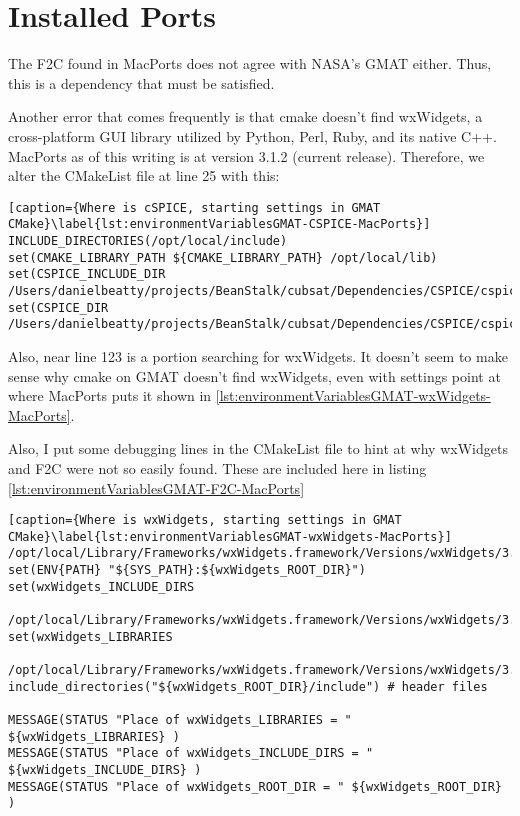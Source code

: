 \documentclass[
  a4paper, %
  11pt, %
  twoside,    %
  onecolumn,  %
  openright,  %
]{memoir}
\begin{document}


\section{Installed Ports} %
\label{sec:installed_ports}


The F2C found in MacPorts does not agree with NASA's GMAT either.  Thus, this is a dependency that must be satisfied.

Another error that comes frequently is that cmake doesn't find wxWidgets, a cross-platform GUI library utilized by Python, Perl, Ruby, and its native C++.  MacPorts as of this writing is at version 3.1.2 (current release).  Therefore, we alter the CMakeList file at line 25 with this:

\begin{tiny}
	\begin{lstlisting}[caption={Where is cSPICE, starting settings in GMAT CMake}\label{lst:environmentVariablesGMAT-CSPICE-MacPorts}]
INCLUDE_DIRECTORIES(/opt/local/include)
set(CMAKE_LIBRARY_PATH ${CMAKE_LIBRARY_PATH} /opt/local/lib)
set(CSPICE_INCLUDE_DIR /Users/danielbeatty/projects/BeanStalk/cubsat/Dependencies/CSPICE/cspice/include)
set(CSPICE_DIR /Users/danielbeatty/projects/BeanStalk/cubsat/Dependencies/CSPICE/cspice)
	\end{lstlisting}
\end{tiny}


Also, near line 123 is a portion searching for wxWidgets.  It doesn't seem to make sense why cmake on GMAT doesn't find wxWidgets, even with settings point at where MacPorts puts it shown in \ref{lst:environmentVariablesGMAT-wxWidgets-MacPorts}.

Also, I put some debugging lines in the CMakeList file to hint at why wxWidgets and F2C were not so easily found. These are included here in listing \ref{lst:environmentVariablesGMAT-F2C-MacPorts}

\begin{tiny}
\begin{lstlisting}[caption={Where is wxWidgets, starting settings in GMAT CMake}\label{lst:environmentVariablesGMAT-wxWidgets-MacPorts}]
/opt/local/Library/Frameworks/wxWidgets.framework/Versions/wxWidgets/3.1/bin)
set(ENV{PATH} "${SYS_PATH}:${wxWidgets_ROOT_DIR}")
set(wxWidgets_INCLUDE_DIRS 	
	/opt/local/Library/Frameworks/wxWidgets.framework/Versions/wxWidgets/3.1/include)
set(wxWidgets_LIBRARIES 	
	/opt/local/Library/Frameworks/wxWidgets.framework/Versions/wxWidgets/3.1/lib)
include_directories("${wxWidgets_ROOT_DIR}/include") # header files

MESSAGE(STATUS "Place of wxWidgets_LIBRARIES = " ${wxWidgets_LIBRARIES} )
MESSAGE(STATUS "Place of wxWidgets_INCLUDE_DIRS = " ${wxWidgets_INCLUDE_DIRS} )
MESSAGE(STATUS "Place of wxWidgets_ROOT_DIR = " ${wxWidgets_ROOT_DIR} )
	\end{lstlisting}
\end{tiny}
\end{document}
